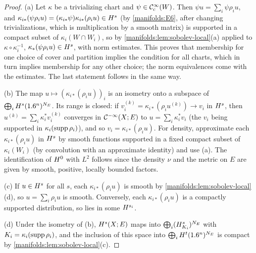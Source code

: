 \begin{proof}
(a) Let $\kappa$ be a trivializing chart and $\psi\in\mathcal{C}^\infty_{\mathrm{c}}(W)$. Then
$\psi u=\sum_i\psi\rho_iu$, and $\kappa_{i*}(\psi\rho_iu)=(\kappa_{i*}\psi)\kappa_{i*}(\rho_iu)\in H^{s}$
(by \ref{manifolds:E6}, after changing trivializations, which is multiplication by
a smooth matrix) is supported in a compact subset of $\kappa_i(W\cap W_i)$, so by
\cref{manifolds:lem:sobolev-local}(a) applied to $\kappa\circ\kappa_i^{-1}$,
$\kappa_*(\psi\rho_iu)\in H^{s}$, with norm estimates. This proves that membership
for one choice of cover and partition implies the condition for all charts, which in
turn implies membership for any other choice; the norm equivalences come with the
estimates. The last statement follows in the same way.

(b) The map $u\mapsto(\kappa_{i*}(\rho_iu))_i$ is an isometry onto a subspace of
$\bigoplus_iH^{s}(1.6^n)^{N_E}$. Its range is closed: if $v_i^{(k)}=\kappa_{i*}(\rho_iu^{(k)})\to v_i$
in $H^{s}$, then $u^{(k)}=\sum_i\kappa_i^*v_i^{(k)}$ converges in $\mathcal{C}^{-\infty}(X;E)$ to
$u=\sum_i\kappa_i^*v_i$ (the $v_i$ being supported in $\kappa_i(\operatorname{supp}\rho_i)$), and so
$v_i=\kappa_{i*}(\rho_iu)$. For density, approximate each $\kappa_{i*}(\rho_iu)$ in $H^{s}$
by smooth functions supported in a fixed compact subset of $\kappa_i(W_i)$ (by
convolution with an approximate identity) and use (a). The identification of $H^{0}$
with $L^2$ follows since the density $\nu$ and the metric on $E$ are given by smooth,
positive, locally bounded factors.

(c) If $u\in H^{s}$ for all $s$, each $\kappa_{i*}(\rho_iu)$ is smooth by
\cref{manifolds:lem:sobolev-local}(d), so $u=\sum_i\rho_iu$ is smooth. Conversely,
each $\kappa_{i*}(\rho_iu)$ is a compactly supported distribution, so lies in some
$H^{s_i}$.

(d) Under the isometry of (b), $H^{s}(X;E)$ maps into
$\bigoplus_i(H^{s}_{K_i})^{N_E}$ with $K_i=\kappa_i(\operatorname{supp}\rho_i)$, and the inclusion of this space
into $\bigoplus_iH^{t}(1.6^n)^{N_E}$ is compact by \cref{manifolds:lem:sobolev-local}(c).


\end{proof}
